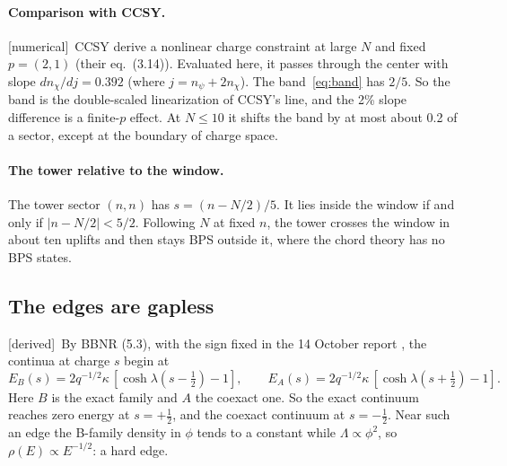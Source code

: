 \documentclass[11pt]{article}
\newcommand{\tagbox}[2]{\textsf{\small\color{#1}[#2]}}
\newcommand{\DER}{\tagbox{cder}{derived}}
\newcommand{\NUM}{\tagbox{cnum}{numerical}}
\theoremstyle{plain}
\theoremstyle{remark}
\numberwithin{equation}{section}
\begin{document}
\paragraph{Comparison with CCSY.} \NUM\ CCSY derive a nonlinear charge constraint at large $N$ and fixed
$p=(2,1)$ (their eq.~(3.14)). Evaluated here, it passes through the center with slope $dn_\chi/dj=0.392$ (where $j=n_\psi+2n_\chi$).
The band~\eqref{eq:band} has $2/5$. So the band is the double-scaled linearization of CCSY's line, and the 2\% slope
difference is a finite-$p$ effect. At $N\le10$ it shifts the band by at most about 0.2 of a sector, except at the boundary
of charge space.

\paragraph{The tower relative to the window.} The tower sector $(n,n)$ has $s=(n-N/2)/5$. It lies inside the window if
and only if $|n-N/2|<5/2$. Following $N$ at fixed $n$, the tower crosses the window in about ten uplifts and then stays
BPS outside it, where the chord theory has no BPS states.

\subsection{The edges are gapless}

\DER\ By BBNR (5.3), with the sign fixed in the 14 October report \cite{prog1014}, the continua at charge $s$ begin at
\begin{equation}\label{eq:edges}
E_B(s)=2q^{-1/2}\kappa\,[\cosh\lambda(s-\tfrac12)-1],\qquad E_A(s)=2q^{-1/2}\kappa\,[\cosh\lambda(s+\tfrac12)-1].
\end{equation}
Here $B$ is the exact family and $A$ the coexact one. So the exact continuum reaches zero energy at $s=+\tfrac12$, and the
coexact continuum at $s=-\tfrac12$. Near such an edge the B-family density in $\phi$ tends to a constant while
$\Lambda\propto\phi^2$, so $\rho(E)\propto E^{-1/2}$: a hard edge.
\end{document}
